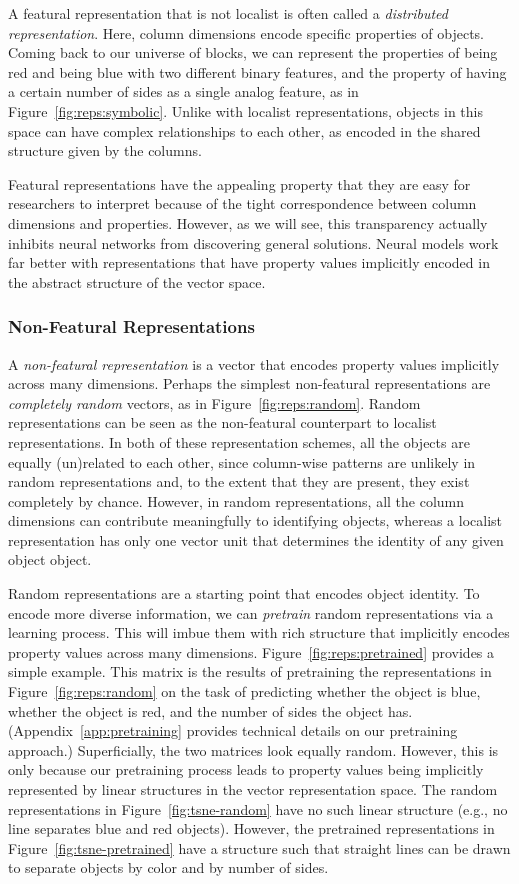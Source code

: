 \documentclass{article}
\newcommand{\Figref}[1]{Figure~\ref{#1}}
\newcommand{\figref}[1]{Figure~\ref{#1}}
\newcommand{\Appref}[1]{Appendix~\ref{#1}}
\newcommand{\tech}[1]{\emph{#1}}
\begin{document}
{A featural representation that is not localist is often called a \tech{distributed representation}. Here, column dimensions encode specific properties of objects. Coming back to our universe of blocks, we can represent the properties of being red and being blue with two different binary features, and the property of having a certain number of sides as a single analog feature, as in \figref{fig:reps:symbolic}. Unlike with localist representations, objects in this space can have complex relationships to each other, as encoded in the shared structure given by the columns.

Featural representations have the appealing property that they are easy for researchers to interpret because of the tight correspondence between column dimensions and properties. However, as we will see, this transparency actually inhibits neural networks from discovering general solutions. Neural models work far better with representations that have property values implicitly encoded in the abstract structure of the vector space.


\subsubsection{Non-Featural Representations}

A \tech{non-featural representation} is a vector that encodes property values implicitly across many dimensions. Perhaps the simplest non-featural representations are \tech{completely random} vectors, as in \figref{fig:reps:random}. Random representations can be seen as the non-featural counterpart to localist representations. In both of these representation schemes, all the objects are equally (un)related to each other, since column-wise patterns are unlikely in random representations and, to the extent that they are present, they exist completely by chance. However, in random representations, all the column dimensions can contribute meaningfully to identifying objects, whereas a localist representation has only one vector unit that determines the identity of any given object object.

Random representations are a starting point that encodes object identity. To encode more diverse information, we can \tech{pretrain} random representations via a learning process. This will imbue them with rich structure that implicitly encodes property values across many dimensions. \Figref{fig:reps:pretrained} provides a simple example. This matrix is the results of pretraining the representations in \figref{fig:reps:random} on the task of predicting whether the object is blue, whether the object is red, and the number of sides the object has. (\Appref{app:pretraining} provides technical details on our pretraining approach.) Superficially, the two matrices look equally random. However, this is only because our pretraining process leads to property values being implicitly represented by linear structures in the vector representation space.  The random representations in \figref{fig:tsne-random} have no such linear structure (e.g., no line separates blue and red objects).  However, the pretrained representations in \figref{fig:tsne-pretrained} have a structure such that straight lines can be drawn to separate objects by color and by number of sides.

}
\end{document}
